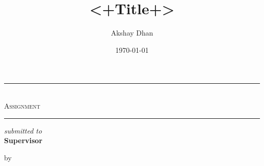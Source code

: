 \documentclass[a4paper,12pt]{article}
\title{\textbf{<+Title+>}}
\author{Akshay Dhan}
\date{\today}
\theoremstyle{definition}
\begin{document}
\makeatletter
\begin{titlepage}
\begin{center}
\hfill
\vfill
\hrule \vspace{.3cm}
\begin{center}
\Huge{\@title} \\
\Large \textsc{Assignment}
\vspace{0.3cm}
\end{center}
\hrule \vspace{.3cm}
\vfill
\large{\it submitted to} \\
\large{\bf Supervisor}\\
\vspace{.4cm}

\large{by}\\
\vspace{.15cm}
\Large{\bf \@author}\\
\vspace{1cm}

\large{\@date}
\end{center}
\end{titlepage}
\end{document}

